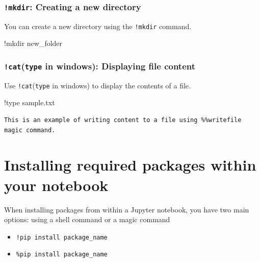 \documentclass[
  letterpaper,
  DIV=11,
  numbers=noendperiod]{scrreprt}
\newenvironment{Shaded}{\begin{snugshade}}{\end{snugshade}}
\newcommand{\BuiltInTok}[1]{\textcolor[rgb]{0.00,0.23,0.31}{#1}}
\newcommand{\NormalTok}[1]{\textcolor[rgb]{0.00,0.23,0.31}{#1}}
\newcommand{\OperatorTok}[1]{\textcolor[rgb]{0.37,0.37,0.37}{#1}}
\providecommand{\tightlist}{%
  \setlength{\itemsep}{0pt}\setlength{\parskip}{0pt}}\usepackage{longtable,booktabs,array}
\begin{document}
\hypertarget{mkdir-creating-a-new-directory}{%
\subsubsection{\texorpdfstring{\texttt{!mkdir}: Creating a new
directory}{!mkdir: Creating a new directory}}\label{mkdir-creating-a-new-directory}}

You can create a new directory using the \texttt{!mkdir} command.

\begin{Shaded}
\begin{Highlighting}[]
\OperatorTok{!}\NormalTok{mkdir new\_folder}
\end{Highlighting}
\end{Shaded}

\hypertarget{cattype-in-windows-displaying-file-content}{%
\subsubsection{\texorpdfstring{\texttt{!cat}(\texttt{type} in windows):
Displaying file
content}{!cat(type in windows): Displaying file content}}\label{cattype-in-windows-displaying-file-content}}

Use \texttt{!cat}(\texttt{type} in windows) to display the contents of a
file.

\begin{Shaded}
\begin{Highlighting}[]
\OperatorTok{!}\BuiltInTok{type}\NormalTok{ sample.txt}
\end{Highlighting}
\end{Shaded}

\begin{verbatim}
This is an example of writing content to a file using %%writefile magic command.
\end{verbatim}

\hypertarget{installing-required-packages-within-your-notebook}{%
\section{Installing required packages within your
notebook}\label{installing-required-packages-within-your-notebook}}

When installing packages from within a Jupyter notebook, you have two
main options: using a shell command or a magic command

\begin{itemize}
\tightlist
\item
  \texttt{!pip\ install\ package\_name}
\item
  \texttt{\%pip\ install\ package\_name}
\end{itemize}
\end{document}

